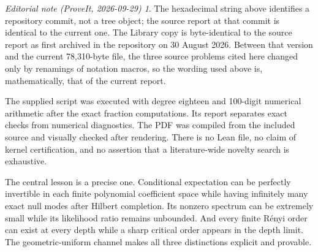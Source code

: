 \documentclass[11pt,a4paper]{article}
\numberwithin{equation}{section}
\theoremstyle{definition}\newtheorem{definition}[theorem]{Definition}
\theoremstyle{remark}\newtheorem{remark}[theorem]{Remark}
\newtheorem*{ednote}{Editorial note (ProveIt, 2026-09-29)}
\begin{document}
\begin{ednote}
The hexadecimal string above identifies a repository commit, not a tree
object; the source report at that commit is identical to the current one.
The Library copy is byte-identical to the source report as first archived in
the repository on 30 August 2026. Between that version and the current
78,310-byte file, the three source problems cited here changed only by
renamings of notation macros, so the wording used above is, mathematically,
that of the current report.
\end{ednote}

The supplied script was executed with degree eighteen and 100-digit numerical arithmetic after the exact fraction computations. Its report separates exact checks from numerical diagnostics. The PDF was compiled from the included source and visually checked after rendering. There is no Lean file, no claim of kernel certification, and no assertion that a literature-wide novelty search is exhaustive.

The central lesson is a precise one. Conditional expectation can be perfectly invertible in each finite polynomial coefficient space while having infinitely many exact null modes after Hilbert completion. Its nonzero spectrum can be extremely small while its likelihood ratio remains unbounded. And every finite R\'enyi order can exist at every depth while a sharp critical order appears in the depth limit. The geometric-uniform channel makes all three distinctions explicit and provable.
\end{document}
